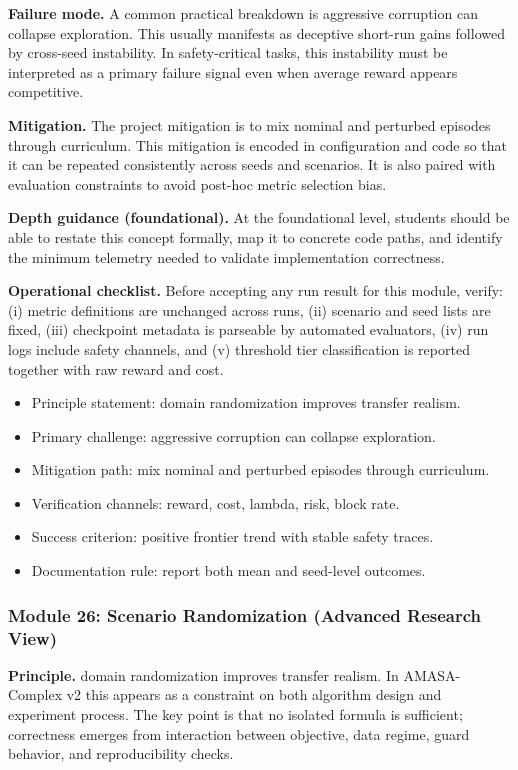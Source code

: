 \documentclass[conference]{IEEEtran}
\begin{document}
\textbf{Failure mode.} A common practical breakdown is aggressive corruption can collapse exploration. This usually manifests as deceptive short-run gains followed by cross-seed instability. In safety-critical tasks, this instability must be interpreted as a primary failure signal even when average reward appears competitive.

\textbf{Mitigation.} The project mitigation is to mix nominal and perturbed episodes through curriculum. This mitigation is encoded in configuration and code so that it can be repeated consistently across seeds and scenarios. It is also paired with evaluation constraints to avoid post-hoc metric selection bias.

\textbf{Depth guidance (foundational).} At the foundational level, students should be able to restate this concept formally, map it to concrete code paths, and identify the minimum telemetry needed to validate implementation correctness.

\textbf{Operational checklist.} Before accepting any run result for this module, verify: (i) metric definitions are unchanged across runs, (ii) scenario and seed lists are fixed, (iii) checkpoint metadata is parseable by automated evaluators, (iv) run logs include safety channels, and (v) threshold tier classification is reported together with raw reward and cost.

\begin{itemize}[leftmargin=*]
  \item Principle statement: domain randomization improves transfer realism.
  \item Primary challenge: aggressive corruption can collapse exploration.
  \item Mitigation path: mix nominal and perturbed episodes through curriculum.
  \item Verification channels: reward, cost, lambda, risk, block rate.
  \item Success criterion: positive frontier trend with stable safety traces.
  \item Documentation rule: report both mean and seed-level outcomes.
\end{itemize}


\subsubsection{Module 26: Scenario Randomization (Advanced Research View)}
\textbf{Principle.} domain randomization improves transfer realism. In AMASA-Complex v2 this appears as a constraint on both algorithm design and experiment process. The key point is that no isolated formula is sufficient; correctness emerges from interaction between objective, data regime, guard behavior, and reproducibility checks.
\end{document}
